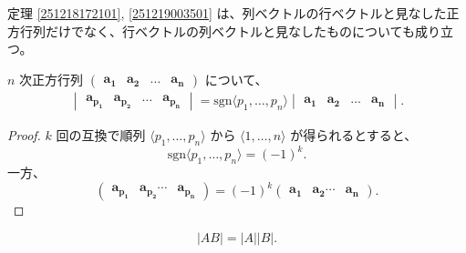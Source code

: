 \begin{col*}
  定理 \ref{251218172101}, \ref{251219003501} は、列ベクトルの行ベクトルと見なした正方行列だけでなく、行ベクトルの列ベクトルと見なしたものについても成り立つ。
\end{col*}

\begin{lmm}\label{251221005801}
  \(n\) 次正方行列 \(
    \begin{pmatrix}
      \bm{a_1} & \bm{a_2} & \ldots & \bm{a_n}
    \end{pmatrix}
  \) について、
  \begin{gather*}
    \begin{vmatrix}
      \bm{a_{p_1}} & \bm{a_{p_2}} & \ldots & \bm{a_{p_n}}
    \end{vmatrix}
    =\mathrm{sgn}\langle p_1,\ldots,p_n\rangle
    \begin{vmatrix}
      \bm{a_1} & \bm{a_2} & \ldots & \bm{a_n}
    \end{vmatrix}.
  \end{gather*}
\end{lmm}

\begin{proof}
  \(k\) 回の互換で順列 \(\langle p_1,\ldots,p_n\rangle\) から \(\langle 1,\ldots,n\rangle\) が得られるとすると、
  \[\mathrm{sgn}\langle p_1,\ldots,p_n\rangle=(-1)^k.\]
  一方、
  \[
    \begin{pmatrix}
      \bm{a_{p_1}} & \bm{a_{p_2}} \cdots & \bm{a_{p_n}}
    \end{pmatrix}
    =(-1)^k
    \begin{pmatrix}
      \bm{a_1} & \bm{a_2} \cdots & \bm{a_n}
    \end{pmatrix}.
  \]
\end{proof}

\begin{thm}
  \[|AB|=|A||B|.\]
\end{thm}

